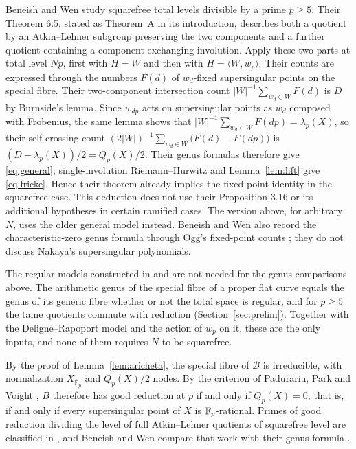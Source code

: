 \documentclass[11pt,a4paper]{article}
\theoremstyle{remark}\newtheorem{remark}[theorem]{Remark}
\numberwithin{equation}{section}
\newcommand{\kk}{\overline{\mathbb F}_p}
\begin{document}
	
	Beneish and Wen \cite{BW} study squarefree total levels divisible by a prime $p\geq5$. Their Theorem 6.5, stated as Theorem~A in its introduction, describes both a quotient by an Atkin--Lehner subgroup preserving the two components and a further quotient containing a component-exchanging involution. Apply these two parts at total level $Np$, first with $H=W$ and then with $H=\langle W,w_p\rangle$. Their counts are expressed through the numbers $F(d)$ of $w_d$-fixed supersingular points on the special fibre. Their two-component intersection count $|W|^{-1}\sum_{w_d\in W}F(d)$ is $D$ by Burnside's lemma. Since $w_{dp}$ acts on supersingular points as $w_d$ composed with Frobenius, the same lemma shows that $|W|^{-1}\sum_{w_d\in W}F(dp)=\lambda_p(X)$, so their self-crossing count $(2|W|)^{-1}\sum_{w_d\in W}\bigl(F(d)-F(dp)\bigr)$ is $(D-\lambda_p(X))/2=Q_p(X)/2$. Their genus formulas therefore give \eqref{eq:general}; single-involution Riemann--Hurwitz and Lemma~\ref{lem:lift} give \eqref{eq:fricke}. Hence their theorem already implies the fixed-point identity in the squarefree case. This deduction does not use their Proposition 3.16 or its additional hypotheses in certain ramified cases. The version above, for arbitrary $N$, uses the older general model instead. Beneish and Wen also record the characteristic-zero genus formula through Ogg's fixed-point counts \cite[Remark 6.6]{BW}; they do not discuss Nakaya's supersingular polynomials.
	
	The regular models constructed in \cite{Xue} and \cite{BW} are not needed for the genus comparisons above. The arithmetic genus of the special fibre of a proper flat curve equals the genus of its generic fibre whether or not the total space is regular, and for $p\geq5$ the tame quotients commute with reduction (Section~\ref{sec:prelim}). Together with the Deligne--Rapoport model and the action of $w_p$ on it, these are the only inputs, and none of them requires $N$ to be squarefree.
	
	By the proof of Lemma~\ref{lem:aricheta}, the special fibre of $\mathscr B$ is irreducible, with normalization $X_{\kk}$ and $Q_p(X)/2$ nodes. By the criterion of Padurariu, Park and Voight \cite[Corollary 3.2]{PPV}, $B$ therefore has good reduction at $p$ if and only if $Q_p(X)=0$, that is, if and only if every supersingular point of $X$ is $\mathbb F_p$-rational. Primes of good reduction dividing the level of full Atkin--Lehner quotients of squarefree level are classified in \cite{PPV}, and Beneish and Wen compare that work with their genus formula \cite[Remark 6.8]{BW}.
	
\end{document}
